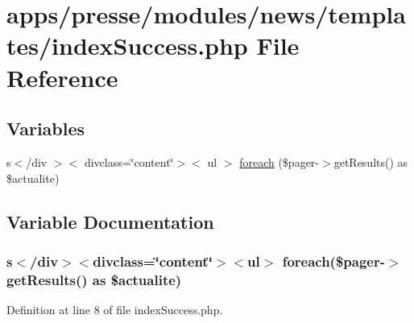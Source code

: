 \hypertarget{presse_2modules_2news_2templates_2index_success_8php}{\section{apps/presse/modules/news/templates/index\-Success.php File Reference}
\label{presse_2modules_2news_2templates_2index_success_8php}
}
\subsection*{Variables}
\begin{DoxyCompactItemize}
\item 
s$<$/div $>$$<$ divclass=\char`\"{}content\char`\"{}$>$$<$ ul $>$ \hyperlink{presse_2modules_2news_2templates_2index_success_8php_abc56db52b2e9a59bcd5c9e45ac5cb332}{foreach} (\$pager-\/$>$get\-Results() as \$actualite)
\end{DoxyCompactItemize}


\subsection{Variable Documentation}
\hypertarget{presse_2modules_2news_2templates_2index_success_8php_abc56db52b2e9a59bcd5c9e45ac5cb332}{
\subsubsection[{foreach}]{\setlength{\rightskip}{0pt plus 5cm}s$<$/div$>$$<$divclass=\char`\"{}content\char`\"{}$>$$<$ul$>$ foreach(\$pager-\/$>$get\-Results() as \$actualite)}}\label{presse_2modules_2news_2templates_2index_success_8php_abc56db52b2e9a59bcd5c9e45ac5cb332}


Definition at line 8 of file index\-Success.\-php.

